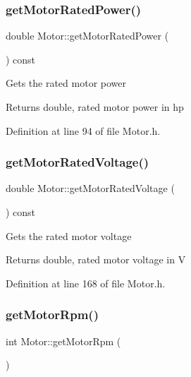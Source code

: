 \subsubsection{\texorpdfstring{get\+Motor\+Rated\+Power()}{getMotorRatedPower()}}
{\footnotesize\ttfamily double Motor\+::get\+Motor\+Rated\+Power (\begin{DoxyParamCaption}{ }\end{DoxyParamCaption}) const\hspace{0.3cm}{\ttfamily [inline]}}

Gets the rated motor power

\begin{DoxyReturn}{Returns}
double, rated motor power in hp 
\end{DoxyReturn}


Definition at line 94 of file Motor.\+h.

\mbox{\label{class_motor_a3fedfc960a6970508b39999c58d44cc6}} 
\subsubsection{\texorpdfstring{get\+Motor\+Rated\+Voltage()}{getMotorRatedVoltage()}}
{\footnotesize\ttfamily double Motor\+::get\+Motor\+Rated\+Voltage (\begin{DoxyParamCaption}{ }\end{DoxyParamCaption}) const\hspace{0.3cm}{\ttfamily [inline]}}

Gets the rated motor voltage

\begin{DoxyReturn}{Returns}
double, rated motor voltage in V 
\end{DoxyReturn}


Definition at line 168 of file Motor.\+h.

\mbox{\label{class_motor_a13826c93b894d699478e34a98ffb35ab}} 
\subsubsection{\texorpdfstring{get\+Motor\+Rpm()}{getMotorRpm()}}
{\footnotesize\ttfamily int Motor\+::get\+Motor\+Rpm (\begin{DoxyParamCaption}{ }\end{DoxyParamCaption})}

